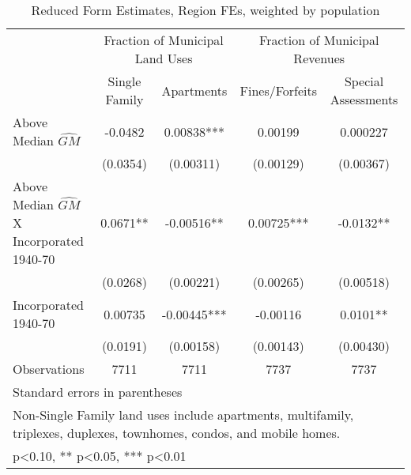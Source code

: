 \begin{table}[htbp]\centering
\def\sym#1{\ifmmode^{#1}\else\(^{#1}\)\fi}
\caption{Reduced Form Estimates, Region FEs, weighted by population}
\begin{tabular}{l*{4}{c}}
\toprule
                    &\multicolumn{2}{c}{Fraction of Municipal Land Uses}&\multicolumn{2}{c}{Fraction of Municipal Revenues}\\\cmidrule(lr){2-3}\cmidrule(lr){4-5}
                    &\multicolumn{1}{c}{Single Family}&\multicolumn{1}{c}{Apartments}&\multicolumn{1}{c}{Fines/Forfeits}&\multicolumn{1}{c}{Special Assessments}\\
\midrule
Above Median $\widehat{GM}$&     -0.0482   &     0.00838***&     0.00199   &    0.000227   \\
                    &    (0.0354)   &   (0.00311)   &   (0.00129)   &   (0.00367)   \\
\addlinespace
Above Median $\widehat{GM}$ X Incorporated 1940-70&      0.0671** &    -0.00516** &     0.00725***&     -0.0132** \\
                    &    (0.0268)   &   (0.00221)   &   (0.00265)   &   (0.00518)   \\
\addlinespace
Incorporated 1940-70&     0.00735   &    -0.00445***&    -0.00116   &      0.0101** \\
                    &    (0.0191)   &   (0.00158)   &   (0.00143)   &   (0.00430)   \\
\midrule
Observations        &        7711   &        7711   &        7737   &        7737   \\
\bottomrule
\multicolumn{5}{l}{\footnotesize Standard errors in parentheses}\\
\multicolumn{5}{l}{\footnotesize Non-Single Family land uses include apartments, multifamily, triplexes, duplexes, townhomes, condos, and mobile homes.}\\
\multicolumn{5}{l}{\footnotesize * p<0.10, ** p<0.05, *** p<0.01}\\
\end{tabular}
\end{table}

